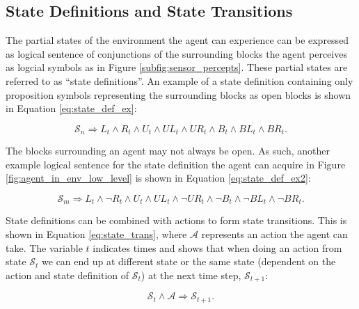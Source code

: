 \subsection{State Definitions and State Transitions}
\label{subsec:state_sentence_form}

The partial states of the environment the agent can experience can be expressed as logical sentence of conjunctions of the surrounding blocks the agent perceives as logcial symbols as in Figure \ref{subfig:sensor_percepts}. These partial states are referred to as ``state definitions''. An example of a state definition containing only proposition symbols representing the surrounding blocks as open blocks is shown in Equation \ref{eq:state_def_ex}:

\begin{equation}
 	\mathcal{S}_n \Rightarrow L_t \wedge R_t \wedge U_t \wedge UL_t \wedge UR_t \wedge B_t \wedge BL_t \wedge BR_t.
 	\label{eq:state_def_ex}
\end{equation}

The blocks surrounding an agent may not always be open. As such, another example logical sentence for the state definition the agent can acquire in Figure \ref{fig:agent_in_env_low_level} is shown in Equation \ref{eq:state_def_ex2}:

\begin{equation}
 	\mathcal{S}_m \Rightarrow L_t \wedge \neg R_t \wedge U_t \wedge UL_t \wedge \neg UR_t \wedge \neg B_t \wedge \neg BL_t \wedge \neg BR_t.
 	\label{eq:state_def_ex2}
\end{equation}

State definitions can be combined with actions to form state transitions. This is shown in Equation \ref{eq:state_trans}, where $\mathcal{A}$ represents an action the agent can take. The variable $t$ indicates times and shows that when doing an action from state $\mathcal{S}_t$ we can end up at different state or the same state (dependent on the action and state definition of $\mathcal{S}_t$) at the next time step, $\mathcal{S}_{t+1}$:



\begin{equation}
 	\mathcal{S}_t \wedge \mathcal{A} \Rightarrow  \mathcal{S}_{t+1}.
 	\label{eq:state_trans}
\end{equation}



